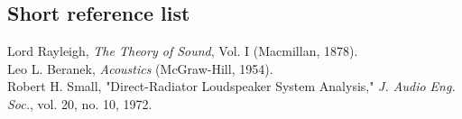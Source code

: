 \subsection*{Short reference list}
Lord Rayleigh, \emph{The Theory of Sound}, Vol. I (Macmillan, 1878).\\
Leo L. Beranek, \emph{Acoustics} (McGraw-Hill, 1954).\\
Robert H. Small, "Direct-Radiator Loudspeaker System Analysis," \emph{J. Audio Eng. Soc.}, vol. 20, no. 10, 1972.